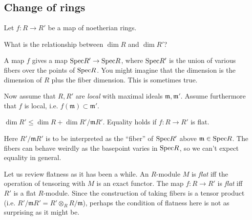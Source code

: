 \subsection{Change of rings}
Let $f: R \to R'$ be  a map of noetherian rings. 

\begin{question} 
What is the relationship between $\dim R$ and $\dim R'$?
\end{question} 

A map $f$ gives a map $\mathrm{Spec} R' \to \mathrm{Spec} R$, where $\mathrm{Spec} R'$ is the union
of various fibers over the points of $\mathrm{Spec} R$. You might imagine that the
dimension is the dimension of $R$ plus the fiber dimension. This is sometimes
true.

Now assume that $R, R'$ are \emph{local}  with maximal ideals $\mathfrak{m},
\mathfrak{m}'$. Assume furthermore that $f$ is local, i.e. $f(\mathfrak{m})
\subset \mathfrak{m}'$.

\begin{theorem} 
$\dim R' \leq \dim R +  \dim R'/\mathfrak{m}R'$. Equality holds if $f: R \to
R'$ is flat.
\end{theorem} 

Here $R'/\mathfrak{m}R'$ is to be interpreted as the ``fiber'' of $\mathrm{Spec} R'$
above $\mathfrak{m} \in \mathrm{Spec} R$. The fibers can behave weirdly as the
basepoint varies in $\mathrm{Spec} R$, so we can't
expect equality in general.

\begin{remark} 
Let us review flatness as it has been a while. An $R$-module $M$ is \emph{flat} iff
the operation of tensoring with $M$ is an exact functor. The map $f: R \to R'$
is \emph{flat} iff $R'$ is a flat $R$-module. Since the construction of taking
fibers is a tensor product (i.e. $R'/\mathfrak{m}R' = R' \otimes_R
R/\mathfrak{m}$), perhaps the condition of flatness here is not as surprising as
it might be.
\end{remark} 

